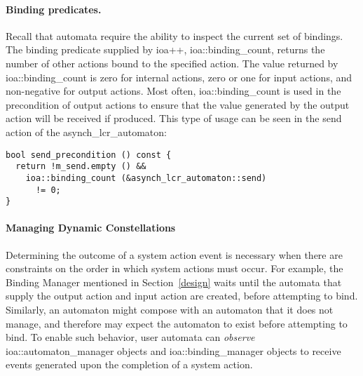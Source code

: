 \paragraph*{Binding predicates.}
Recall that automata require the ability to inspect the current set of bindings.
The binding predicate supplied by ioa++, ioa::binding\_count, returns the number of other actions bound to the specified action.
The value returned by ioa::binding\_count is zero for internal actions, zero or one for input actions, and non-negative for output actions.
Most often, ioa::binding\_count is used in the precondition of output actions to ensure that the value generated by the output action will be received if produced.
\ifjournal
This type of usage can be seen in the send action of the asynch\_lcr\_automaton:
\begin{lstlisting}
bool send_precondition () const {
  return !m_send.empty () &&
    ioa::binding_count (&asynch_lcr_automaton::send)
      != 0;
}
\end{lstlisting}
\fi


\paragraph*{Managing Dynamic Constellations}
Determining the outcome of a system action event is necessary when there are constraints on the order in which system actions must occur.
For example, the Binding Manager mentioned in Section~\ref{design} waits until the automata that supply the output action and input action are created, before attempting to bind.
Similarly, an automaton might compose with an automaton that it does not manage, and therefore may expect the automaton to exist before attempting to bind.
To enable such behavior, user automata can \emph{observe} ioa::automaton\_manager objects and ioa::binding\_manager objects to receive events generated upon the completion of a system action.

